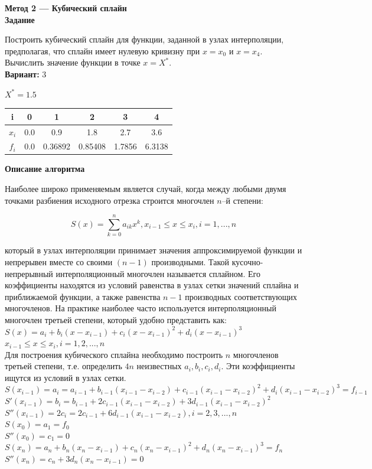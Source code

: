 \textbf{Метод 2 --- Кубический сплайн}\\

\textbf{Задание}

Построить кубический сплайн для функции, заданной в узлах интерполяции, предполагая, что сплайн имеет нулевую кривизну при $x=x_0$ и $x=x_4$. Вычислить значение функции в точке $x=X^*$.\\

\textbf{Вариант:} 3

$X^*=1.5$\\
\begin{tabular}{|c|c|c|c|c|c|}
\hline
i & 0 & 1 & 2 & 3 & 4 \\
\hline
$x_i$ & 0.0 & 0.9 & 1.8 & 2.7 & 3.6 \\
\hline
$f_i$ & 0.0 & 0.36892 & 0.85408 & 1.7856 & 6.3138 \\
\hline
\end{tabular}
\vspace{0.5cm}

\textbf{Описание алгоритма}

Наиболее широко применяемым является случай, когда между любыми двумя точками разбиения исходного отрезка строится многочлен $n$--й степени:

$$
S(x)=\sum\limits_{k=0}^na_{ik}x^k, x_{i-1} \leq x \leq x_i, i=1,...,n
$$

который в узлах интерполяции принимает значения аппроксимируемой функции и непрерывен вместе со своими $(n-1)$ производными. Такой кусочно-непрерывный интерполяционный многочлен называется сплайном. Его коэффициенты находятся из условий равенства в узлах сетки значений сплайна и приближаемой функции, а также равенства $n-1$ производных соответствующих многочленов. На практике наиболее часто используется интерполяционный многочлен третьей степени, который удобно представить как:\\

$S(x)=a_i+b_i(x-x_{i-1})+c_i(x-x_{i-1})^2+d_i(x-x_{i-1})^3$\\
$x_{i-1} \leq x \leq x_i, i=1,2,...,n$\\

Для построения кубического сплайна необходимо построить $n$ многочленов третьей степени, т.е. определить $4n$ неизвестных $a_i, b_i, c_i, d_i$. Эти коэффициенты ищутся из условий в узлах сетки.\\

$S(x_{i-1})=a_i=a_{i-1}+b_{i-1}(x_{i-1}-x_{i-2})+c_{i-1}(x_{i-1}-x_{i-2})^2+d_i(x_{i-1}-x_{i-2})^3=f_{i-1}$\\
$S'(x_{i-1})=b_i=b_{i-1}+2c_{i-1}(x_{i-1}-x_{i-2})+3d_{i-1}(x_{i-1}-x_{i-2})^2$\\
$S''(x_{i-1})=2c_i=2c_{i-1}+6d_{i-1}(x_{i-1}-x_{i-2}), i=2,3,...,n$\\
$S(x_0)=a_1=f_0$\\
$S''(x_0)=c_1=0$\\
$S(x_n)=a_n+b_n(x_n-x_{i-1})+c_n(x_n-x_{i-1})^2+d_n(x_n-x_{i-1})^3=f_n$\\
$S''(x_n)=c_n+3d_n(x_n-x_{i-1})=0$\\

